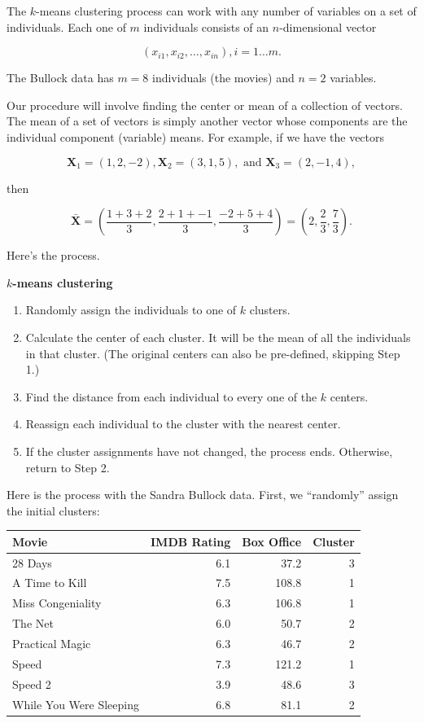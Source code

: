 \documentclass[
]{book}
\theoremstyle{definition}
\theoremstyle{definition}
\theoremstyle{definition}
\theoremstyle{definition}
\theoremstyle{remark}
\begin{document}
The \(k\)-means clustering process can work with any number of variables on a set of individuals. Each one of \(m\) individuals consists of an \(n\)-dimensional vector

\[(x_{i1},x_{i2},\dots,x_{in}),i=1\dots m.\]

The Bullock data has \(m=8\) individuals (the movies) and \(n=2\) variables.

Our procedure will involve finding the center or mean of a collection of vectors. The mean of a set of vectors is simply another vector whose components are the individual component (variable) means. For example, if we have the vectors

\[\mathbf{X}_1=(1,2,-2),\mathbf{X}_2=(3,1,5),\text{ and } \mathbf{X}_3=(2,-1,4),\]

then

\[\bar{\mathbf{X}}=\left(\frac{1+3+2}{3},\frac{2+1+-1}{3},\frac{-2+5+4}{3}\right)=\left(2,\frac{2}{3},\frac{7}{3}\right).\]

Here's the process.

\begin{propbox}

\textbf{\(k\)-means clustering}

\begin{enumerate}
\def\labelenumi{\arabic{enumi}.}
\item
  Randomly assign the individuals to one of \(k\) clusters.
\item
  Calculate the center of each cluster. It will be the mean of all the individuals in that cluster. (The original centers can also be pre-defined, skipping Step 1.)
\item
  Find the distance from each individual to every one of the \(k\) centers.
\item
  Reassign each individual to the cluster with the nearest center.
\item
  If the cluster assignments have not changed, the process ends. Otherwise, return to Step 2.
\end{enumerate}

\end{propbox}

Here is the process with the Sandra Bullock data. First, we ``randomly'' assign the initial clusters:

\begin{longtable}{lrrr}
\toprule
Movie & IMDB Rating & Box Office & Cluster\\
\midrule
28 Days & 6.1 & 37.2 & 3\\
A Time to Kill & 7.5 & 108.8 & 1\\
Miss Congeniality & 6.3 & 106.8 & 1\\
The Net & 6.0 & 50.7 & 2\\
Practical Magic & 6.3 & 46.7 & 2\\
Speed & 7.3 & 121.2 & 1\\
Speed 2 & 3.9 & 48.6 & 3\\
While You Were Sleeping & 6.8 & 81.1 & 2\\
\bottomrule
\end{longtable}
\end{document}
